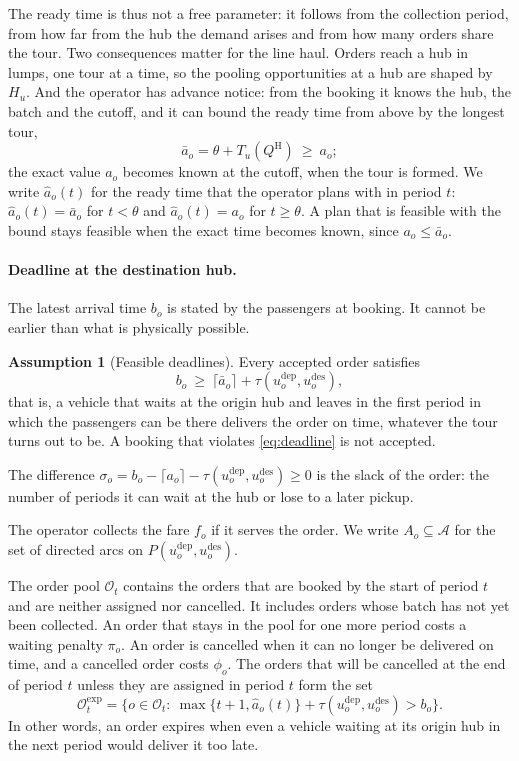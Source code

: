 \documentclass[12pt]{article}
\theoremstyle{plain}
\theoremstyle{definition}
\newtheorem{assumption}{Assumption}
\newcommand{\dep}{u^{\mathrm{dep}}}
\newcommand{\des}{u^{\mathrm{des}}}
\newcommand{\Oexp}{\mathcal{O}^{\mathrm{exp}}_t}
\begin{document}
The ready time is thus not a free parameter: it follows from the collection period, from how far from the hub the demand arises and from how many orders share the tour. Two consequences matter for the line haul. Orders reach a hub in lumps, one tour at a time, so the pooling opportunities at a hub are shaped by $H_u$. And the operator has advance notice: from the booking it knows the hub, the batch and the cutoff, and it can bound the ready time from above by the longest tour,
\begin{equation}\label{eq:readybound}
\bar a_o=\theta+T_u(Q^{\mathrm{H}})\ \ge\ a_o ;
\end{equation}
the exact value $a_o$ becomes known at the cutoff, when the tour is formed. We write $\hat a_o(t)$ for the ready time that the operator plans with in period $t$: $\hat a_o(t)=\bar a_o$ for $t<\theta$ and $\hat a_o(t)=a_o$ for $t\ge\theta$. A plan that is feasible with the bound stays feasible when the exact time becomes known, since $a_o\le\bar a_o$.

\paragraph{Deadline at the destination hub.} The latest arrival time $b_o$ is stated by the passengers at booking. It cannot be earlier than what is physically possible.

\begin{assumption}[Feasible deadlines]\label{as:deadline}
Every accepted order satisfies
\begin{equation}\label{eq:deadline}
b_o\ \ge\ \lceil\bar a_o\rceil+\tau(\dep_o,\des_o),
\end{equation}
that is, a vehicle that waits at the origin hub and leaves in the first period in which the passengers can be there delivers the order on time, whatever the tour turns out to be. A booking that violates \eqref{eq:deadline} is not accepted.
\end{assumption}

The difference $\sigma_o=b_o-\lceil a_o\rceil-\tau(\dep_o,\des_o)\ge 0$ is the slack of the order: the number of periods it can wait at the hub or lose to a later pickup.

The operator collects the fare $f_o$ if it serves the order. We write $A_o\subseteq\mathcal{A}$ for the set of directed arcs on $P(\dep_o,\des_o)$.

The order pool $\mathcal{O}_t$ contains the orders that are booked by the start of period $t$ and are neither assigned nor cancelled. It includes orders whose batch has not yet been collected. An order that stays in the pool for one more period costs a waiting penalty $\pi_o$. An order is cancelled when it can no longer be delivered on time, and a cancelled order costs $\phi_o$. The orders that will be cancelled at the end of period $t$ unless they are assigned in period $t$ form the set
\begin{equation}\label{eq:oexp}
\Oexp=\bigl\{o\in\mathcal{O}_t:\ \max\{t+1,\hat a_o(t)\}+\tau(\dep_o,\des_o)>b_o\bigr\}.
\end{equation}
In other words, an order expires when even a vehicle waiting at its origin hub in the next period would deliver it too late.
\end{document}
